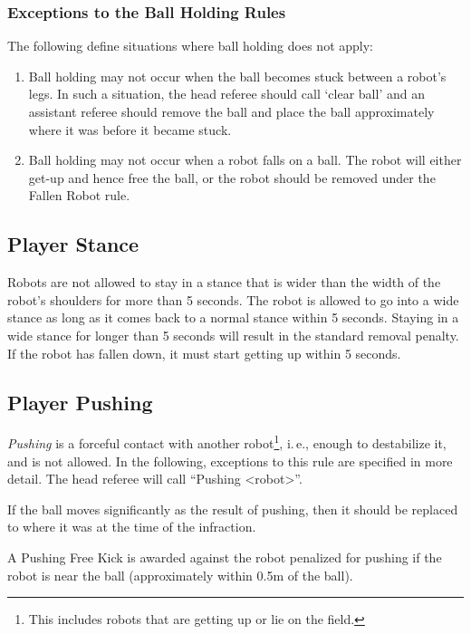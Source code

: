 \documentclass[12pt]{article}
\newcommand{\ie}{\mbox{i.\,e.}\xspace}
\begin{document}
\subsubsection{Exceptions to the Ball Holding Rules}
\label{sec:situations_no_ball_holding}

The following define situations where ball holding does not apply:

\begin{enumerate}
\item Ball holding may not occur when the ball becomes stuck between a robot's legs.  In such a situation, the head referee should call `clear ball' and an assistant referee should remove the ball and place the ball approximately where it was before it became stuck.
\item Ball holding may not occur when a robot falls on a ball.  The robot will either get-up and hence free the ball, or the robot should be removed under the Fallen Robot rule.
\end{enumerate}

\subsection{Player Stance}
\label{sec:player_stance}

Robots are not allowed to stay in a stance that is wider than the width of the robot's shoulders for more than 5 seconds. The robot is allowed to go into a wide stance as long as it comes back to a normal stance within 5 seconds. Staying in a wide stance for longer than 5 seconds will result in the standard removal penalty. If the robot has fallen down, it must start getting up within 5 seconds.

\subsection{Player Pushing}
\label{sec:player_pushing}

\emph{Pushing} is a forceful contact with another robot\footnote{This includes robots that are getting up or lie on the field.}, \ie, enough to destabilize it, and is not allowed. In the following, exceptions to this rule are specified in more detail.
The head referee will call ``Pushing \textless robot\textgreater''.

If the ball moves significantly as the result of pushing, then it should be replaced to where it was at the time of the infraction.

A Pushing Free Kick is awarded against the robot penalized for pushing if the robot is near the ball (approximately within 0.5m of the ball).
\end{document}
